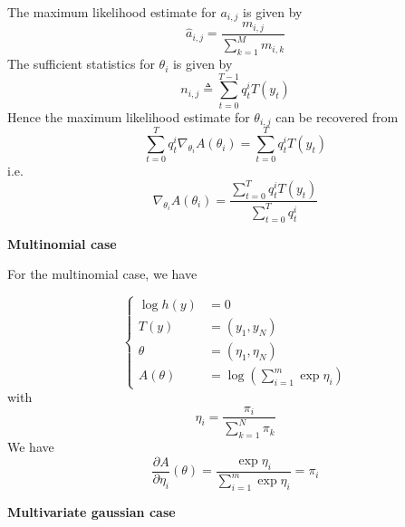 \documentclass[a4paper, 11pt]{article}
\newcommand{\pd}[2]{\frac{\partial #1}{\partial #2}}
\newcommand{\grad}{\nabla}
\newcommand{\eqdef}{\triangleq}
\begin{document}
The maximum likelihood estimate for $a_{i, j}$ is given by
\begin{displaymath}
  \hat{a}_{i,j} = \dfrac{
    m_{i,j}
  }{
    \sum_{k = 1}^M m_{i, k}
  }
\end{displaymath}
The sufficient statistics for $\theta_{i}$ is given by
\begin{displaymath}
  n_{i, j} \eqdef \sum_{t = 0}^{T-1} q_t^i T(y_t)
\end{displaymath}
Hence the maximum likelihood estimate for $\theta_{i, j}$ can be
recovered from
\begin{displaymath}
  \sum_{t = 0}^T q_t^i \grad_{\theta_i}A(\theta_i) = \sum_{t = 0}^T q_t^i T(y_t)
\end{displaymath}
i.e.
\begin{displaymath}
  \grad_{\theta_i}A(\theta_i) = \dfrac{
    \sum_{t = 0}^T q_t^i T(y_t)
  }{
    \sum_{t = 0}^T q_t^i
  }
\end{displaymath}


\textbf{Multinomial case}

For the multinomial case, we have

\begin{displaymath}
  \left\{
  \begin{array}{rl}
    \log{h(y)} & = 0 \\[.5em]
    T(y) & = (y_1, y_{N}) \\[.5em]
    \theta & = (\eta_1, \eta_N) \\[.5em]
    A(\theta) &= \log{\left( \sum_{i = 1}^m \exp{\eta_i}\right)}
  \end{array}
  \right.
\end{displaymath}
with
\begin{displaymath}
  \eta_i = \dfrac{
    \pi_i
  }{
    \sum_{k = 1}^N \pi_k
  }
\end{displaymath}
We have
\begin{displaymath}
  \pd{A}{\eta_i}(\theta) = \dfrac{
    \exp{\eta_i}
  }{
    \sum_{i = 1}^m \exp{\eta_i}
  } = \pi_i
\end{displaymath}


\textbf{Multivariate gaussian case}
\end{document}

